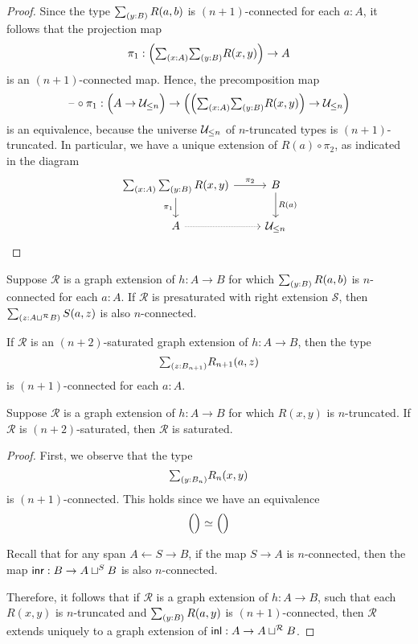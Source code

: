 \begin{proof}
Since the type $\sm{y:B}R(a,b)$ is $(n+1)$-connected for each $a:A$, it follows that the projection map
\begin{equation*}
\pi_1 : \Big(\sm{x:A}{y:B}R(x,y)\Big)\to A
\end{equation*}
is an $(n+1)$-connected map. Hence, the precomposition map
\begin{equation*}
\blank\circ\pi_1 : \Big(A\to \UU_{\leq n}\Big)\to \Big(\Big(\sm{x:A}{y:B}R(x,y)\Big)\to \UU_{\leq n}\Big)
\end{equation*}
is an equivalence, because the universe $\mathcal{U}_{\leq n}$ of $n$-truncated types is $(n+1)$-truncated.
In particular, we have a unique extension of $R(a)\circ \pi_2$, as indicated in the diagram
\begin{equation*}
\begin{tikzcd}
\sm{x:A}{y:B}R(x,y) \arrow[r,"\pi_2"] \arrow[d,swap,"\pi_1"] & B \arrow[d,"R(a)"] \\
A \arrow[r,densely dotted] & \UU_{\leq n}
\end{tikzcd}
\end{equation*}
\end{proof}

\begin{lem}
Suppose $\mathcal{R}$ is a graph extension of $h:A\to B$ for which $\sm{y:B}R(a,b)$ is $n$-connected for each $a:A$. If $\mathcal{R}$ is presaturated with right extension $\mathcal{S}$, then $\sm{z:A\sqcup^{\mathcal{R}} B}S(a,z)$ is also $n$-connected.
\end{lem}

\begin{lem}
If $\mathcal{R}$ is an $(n+2)$-saturated graph extension of $h:A\to B$, then the type
\begin{equation*}
\sm{z:B_{n+1}}R_{n+1}(a,z)
\end{equation*}
is $(n+1)$-connected for each $a:A$.
\end{lem}

\begin{thm}
Suppose $\mathcal{R}$ is a graph extension of $h:A\to B$ for which $R(x,y)$ is $n$-truncated. If $\mathcal{R}$ is $(n+2)$-saturated, then $\mathcal{R}$ is saturated.
\end{thm}

\begin{proof}
First, we observe that the type
\begin{equation*}
\sm{y:B_n}R_{n}(x,y)
\end{equation*}
is $(n+1)$-connected. This holds since we have an equivalence
\begin{equation*}
\eqv{\Big(\Big)}{\Big(\Big)}
\end{equation*}

Recall that for any span $A \leftarrow S \rightarrow B$, if the map $S\to A$ is $n$-connected, then the map ${\mathsf{inr}}:B\to A\sqcup^S B$ is also $n$-connected.

Therefore, it follows that if $\mathcal{R}$ is a graph extension of $h:A\to B$, such that each $R(x,y)$ is $n$-truncated and $\sm{y:B}R(a,y)$ is $(n+1)$-connected, then $\mathcal{R}$ extends uniquely to a graph extension of ${\mathsf{inl}}:A\to A\sqcup^{\mathcal{R}} B$.
\end{proof}

